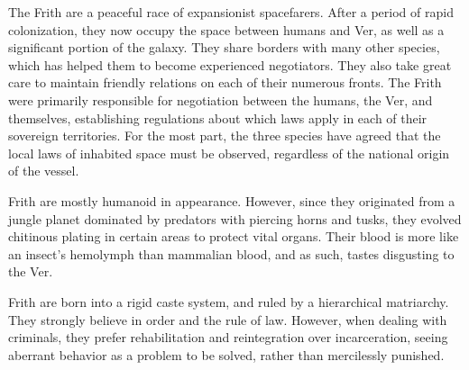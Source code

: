 \documentclass[blue]{guildcamp4}
\begin{document}
\name{\bFrith{}}

The Frith are a peaceful race of expansionist spacefarers. After a period of rapid colonization, they now occupy the space between humans and Ver, as well as a significant portion of the galaxy. They share borders with many other species, which has helped them to become experienced negotiators. They also take great care to maintain friendly relations on each of their numerous fronts. The Frith were primarily responsible for negotiation between the humans, the Ver, and themselves, establishing regulations about which laws apply in each of their sovereign territories. For the most part, the three species have agreed that the local laws of inhabited space must be observed, regardless of the national origin of the vessel.
	
Frith are mostly humanoid in appearance. However, since they originated from a jungle planet dominated by predators with piercing horns and tusks, they evolved chitinous plating in certain areas to protect vital organs. Their blood is more like an insect's hemolymph than mammalian blood, and as such, tastes disgusting to the Ver.

Frith are born into a rigid caste system, and ruled by a hierarchical matriarchy. They strongly believe in order and the rule of law. However, when dealing with criminals, they prefer rehabilitation and reintegration over incarceration, seeing aberrant behavior as a problem to be solved, rather than mercilessly punished.
	
\end{document}
